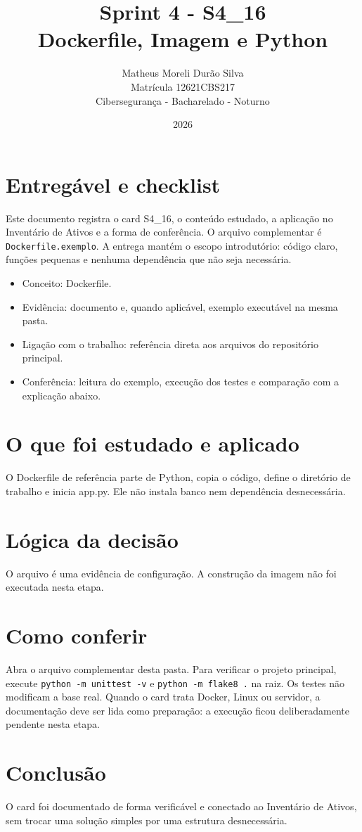 \documentclass[12pt]{article}
\title{Sprint 4 - S4\_16\\Dockerfile, Imagem e Python}
\author{Matheus Moreli Durão Silva\\ Matrícula 12621CBS217\\ Cibersegurança - Bacharelado - Noturno}
\date{2026}
\begin{document}
\maketitle

\section*{Entregável e checklist}
Este documento registra o card S4\_16, o conteúdo estudado, a aplicação no Inventário de Ativos e a forma de conferência. O arquivo complementar é \texttt{Dockerfile.exemplo}. A entrega mantém o escopo introdutório: código claro, funções pequenas e nenhuma dependência que não seja necessária.

\begin{itemize}
\item Conceito: Dockerfile.
\item Evidência: documento e, quando aplicável, exemplo executável na mesma pasta.
\item Ligação com o trabalho: referência direta aos arquivos do repositório principal.
\item Conferência: leitura do exemplo, execução dos testes e comparação com a explicação abaixo.
\end{itemize}

\section*{O que foi estudado e aplicado}
O Dockerfile de referência parte de Python, copia o código, define o diretório de trabalho e inicia app.py. Ele não instala banco nem dependência desnecessária.

\section*{Lógica da decisão}
O arquivo é uma evidência de configuração. A construção da imagem não foi executada nesta etapa.

\section*{Como conferir}
Abra o arquivo complementar desta pasta. Para verificar o projeto principal, execute \texttt{python -m unittest -v} e \texttt{python -m flake8 .} na raiz. Os testes não modificam a base real. Quando o card trata Docker, Linux ou servidor, a documentação deve ser lida como preparação: a execução ficou deliberadamente pendente nesta etapa.

\section*{Conclusão}
O card foi documentado de forma verificável e conectado ao Inventário de Ativos, sem trocar uma solução simples por uma estrutura desnecessária.
\end{document}
